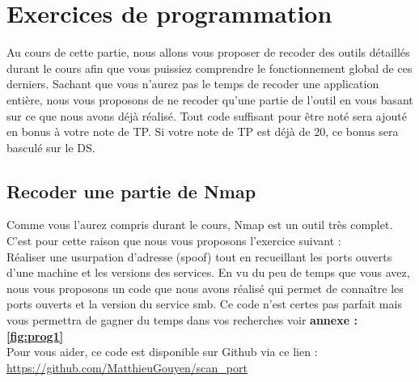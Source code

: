 \chapter{Exercices de programmation}

Au cours de cette partie, nous allons vous proposer de recoder des outils détaillés durant le cours afin que vous puissiez comprendre le fonctionnement global de ces derniers. Sachant que vous n'aurez pas le temps de recoder une application entière, nous vous proposons de ne recoder qu'une partie de l'outil en vous basant sur ce que nous avons déjà réalisé. Tout code suffisant pour être noté sera ajouté en bonus à votre note de TP. Si votre note de TP est déjà de 20, ce bonus sera basculé sur le DS.

\section{Recoder une partie de Nmap}

Comme vous l'aurez compris durant le cours, Nmap est un outil très complet. C'est pour cette raison que nous vous proposons l'exercice suivant :\\
Réaliser une usurpation d'adresse (spoof) tout en recueillant les ports ouverts d'une machine et les versions des services. En vu du peu de temps que vous avez, nous vous proposons un code que nous avons réalisé qui permet de connaître les ports ouverts et la version du service smb. Ce code n'est certes pas parfait mais vous permettra de gagner du temps dans vos recherches voir \textbf{annexe : \ref{fig:prog1}}\\


 Pour vous aider, ce code est disponible sur Github via ce lien :\\
\url{https://github.com/MatthieuGouyen/scan\_port}


